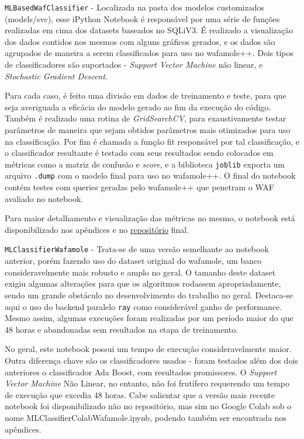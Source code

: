 \begin{alineas}
\begin{alineas}
\end{alineas}
\item \verb+MLBasedWafClassifier+ - Localizada na pasta dos modelos customizados (models/svc), esse iPython Notebook é responsável por uma série de funções realizadas em cima dos datasets baseados no SQLiV3. É realizado a visualização dos dados contidos nos mesmos com alguns gráficos gerados, e os dados são agrupados de maneira a serem classificados para uso no wafamole++. Dois tipos de classificadores são suportados - \textit{Support Vector Machine} não linear, e \textit{Stochastic Gradient Descent}. 

Para cada caso, é feito uma divisão em dados de treinamento e teste, para que seja averiguada a eficácia do modelo gerado ao fim da execução do código. Também é realizado uma rotina de \textit{GridSearchCV}, para exaustivamente testar parâmetros de maneira que sejam obtidos parâmetros mais otimizados para uso na classificação. Por fim é chamada a função fit responsável por tal classificação, e o classificador resultante é testado com seus resultados sendo colocados em métricas como a matriz de confusão e \textit{score}, e a biblioteca \verb+joblib+ exporta um arquivo \verb+.dump+ com o modelo final para uso no wafamole++. O final do notebook contém testes com queries geradas pelo wafamole++ que penetram o WAF avaliado no notebook.

Para maior detalhamento e visualização das métricas no mesmo, o notebook está disponibilizado nos apêndices e no \href{https://github.com/nidnogg/tcc}{repositório} final.

\item \verb+MLClassifierWafamole+ - Trata-se de uma versão semelhante ao notebook anterior, porém fazendo uso do dataset original do wafamole, um banco consideravelmente mais robusto e amplo no geral. O tamanho deste dataset exigiu algumas alterações para que os algoritmos rodassem apropriadamente, sendo um grande obstáculo no desenvolvimento do trabalho no geral. Destaca-se aqui o uso do backend paralelo \verb+ray+ como considerável ganho de performance. Mesmo assim, algumas execuções foram realizadas por um período maior do que 48 horas e abandonadas sem resultados na etapa de treinamento.

No geral, este notebook possui um tempo de execução consideravelmente maior. Outra diferença chave são os classificadores usados - foram testados além dos dois anteriores o classificador Ada Boost, com resultados promissores. O \textit{Support Vector Machine} Não Linear, no entanto, não foi frutífero requerendo um tempo de execução que excedia 48 horas. Cabe salientar que a versão mais recente notebook foi disponibilizado não no repositório, mas sim no Google Colab sob o nome MLClassifierColabWafamole.ipynb, podendo também ser encontrada nos apêndices.
\end{alineas}

